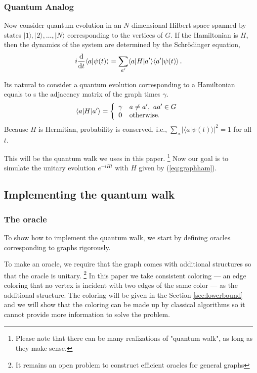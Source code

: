 \documentclass[aps,11pt,twoside,nofootinbib,tightenlines,superscriptaddress,preprintnumbers]{revtex4}
\makeatletter
\newcommand{\<}{\langle}
\renewcommand{\>}{\rangle}
\newcommand{\be}{\begin{equation}}
\newcommand{\ee}{\end{equation}}
\newcommand{\cond}[1]{\left\{\begin{array}{l@{~~~}l}#1\end{array}\right.}
\newenvironment{proof sketch}
{\trivlist\item\noindent{\bf Proof sketch}~}
{\qed\endtrivlist}
\makeatother
\begin{document}
\subsubsection{Quantum Analog}

Now consider quantum evolution in an $N$-dimensional Hilbert space spanned
by states $|1\>, |2\>, \ldots, |N\>$ corresponding to the vertices of $G$.
If the Hamiltonian is $H$, then the dynamics of the system are determined
by the Schr\"odinger equation,
\be
  i {{\mathrm d} \over {\mathrm d}t} \<a|\psi(t)\> 
    = \sum_{a'} \<a|H|a'\> \<a'|\psi(t)\>
\,.
\label{eq:schrodinger}
\ee

Its natural to consider a quantum evolution corresponding to a Hamiltonian equals to s the adjacency matrix of the graph times $\gamma$.
\be
  \<a|H|a'\> = \cond{ \gamma & a \ne a', \ aa' \in G \\
                      0      & \textrm{otherwise.} }
\label{eq:graphham}
\ee
Because $H$ is Hermitian, probability is conserved, i.e., $\sum_a
|\<a|\psi(t)\>|^2=1$ for all $t$.

This will be the quantum walk we uses in this paper. \footnote{Please note that there can be many realizations of "quantum walk", as long as they make sense.} Now our goal is to simulate the unitary evolution $e^{-i H t}$ with $H$ given by (\ref{eq:graphham}).

\subsection{Implementing the quantum walk}\label{subsec:implement}

\subsubsection{The oracle}

To show how to implement the quantum walk, we start by defining oracles corresponding to graphs rigorously.

To make an oracle, we require that the graph comes with additional structures so that the oracle is unitary. \footnote{It remains an open problem to construct efficient oracles for general graphs} In this paper we take consistent coloring --- an edge coloring that no vertex is incident with two edges of the same color --- as the additional structure. The coloring will be given in the Section \ref{sec:lowerbound} and we will show that the coloring can be made up by classical algorithms so it cannot provide more information to solve the problem. 
\end{document}
